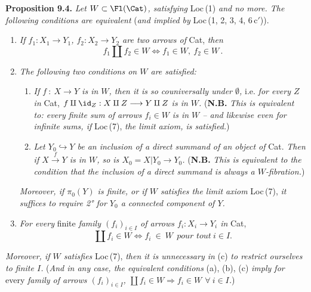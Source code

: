 \textbf{Proposition 9.4.} \textit{Let $W\subset\Fl(\Cat)$, satisfying} Loc\,(1) \textit{and no more. The following conditions are equivalent} (\textit{and implied by} Loc\,(1, 2, 3, 4, 6\,c$'$)).
\begin{enumerate}[label={}, leftmargin=2.5em]
\item[a)] \textit{If $f_1 : X_1\longrightarrow Y_1$, $f_2 : X_2\longrightarrow Y_2$ are two arrows of} Cat, \textit{then}
\[
f_1\amalg f_2\in W\iff f_1\in W,\ f_2\in W\,.
\]
\item[b)] \textit{The following two conditions on $W$ are satisfied:}


\begin{enumerate}[label={}, leftmargin=2.5em]
\item[1°)] \textit{If $f\ :\ X\longrightarrow Y$ is in $W$, then it is so couniversally under $\emptyset$,} i.e. \textit{for every $Z$ in} Cat, \textit{$f\amalg\id_Z : X\amalg Z\longrightarrow Y\amalg Z$ is in $W$.} (\textbf{N.B.} \textit{This is equivalent to: every finite sum of arrows $f_i\in W$ is in $W$ – and likewise even for infinite sums, if} Loc\,(7), \textit{the limit axiom, is satisfied.})
\item[2°)] \textit{Let $Y_0\hookrightarrow Y$ be an inclusion of a direct summand of an object of} Cat. \textit{Then if $X\xrightarrow{\ f\ }Y$ is in $W$, so is $X_0=X|Y_0\longrightarrow Y_0$.} (\textbf{N.B.} \textit{This is equivalent to the condition that the inclusion of a direct summand is always a $W$-fibration.})
\end{enumerate}

\textit{Moreover, if $\pi_0(Y)$ is finite, or if $W$ satisfies the limit axiom} Loc\,(7), \textit{it suffices to require 2° for $Y_0$ a connected component of $Y$.}


\item[c)] \textit{For every} finite \textit{family $(f_i)_{i\in I}$ of arrows $f_i : X_i\longrightarrow Y_i$ in} Cat,
\[
\coprod f_i\in W\iff f_i\ \in\ W\ \ \textit{pour tout}\ i\in I.
\]
\end{enumerate}
\textit{Moreover, if $W$ satisfies} Loc\,(7), \textit{then it is unnecessary in} (c) \textit{to restrict ourselves to finite $I$.} (\textit{And in any case, the equivalent conditions} (a), (b), (c) \textit{imply for} every \textit{family of arrows $(f_i)_{i\in I}$, $\coprod f_i\in W\Longrightarrow f_i\in W$ $\forall\ i\in I$.})


